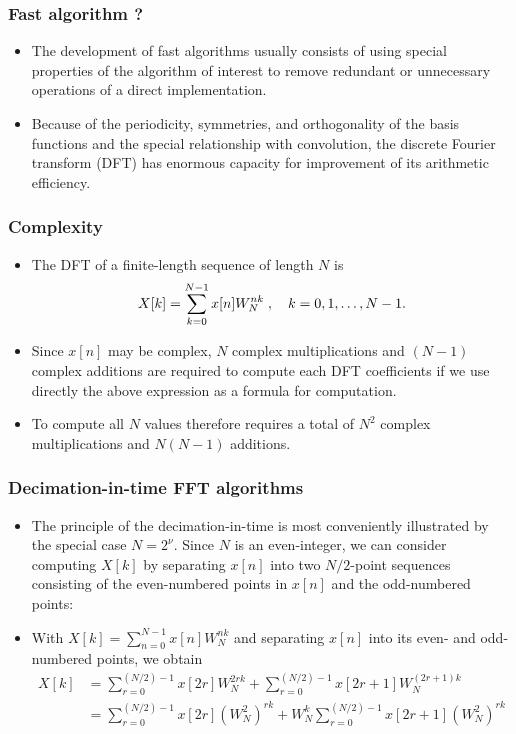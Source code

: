 \begin{frame}
\frametitle{Fast algorithm ?}
\begin{itemize}
\item The development of fast algorithms usually consists of using special properties of the algorithm of interest to remove redundant or unnecessary operations of a direct implementation. 
\item Because of the periodicity, symmetries, and orthogonality of the basis functions and the special relationship with convolution, the discrete Fourier transform (DFT) has enormous capacity for improvement of its arithmetic efficiency.
\end{itemize}
\end{frame}

\begin{frame}
\frametitle{Complexity}
\begin{itemize}
\item The DFT of a finite-length sequence of length $N$ is
\[
X[k]= \sum_{k=0}^{N-1} x[n] W_N^{nk} \;, \quad k=0,1,\dots,N-1.
\]
\item Since $x[n]$ may be complex, $N$ complex multiplications and $(N-1)$ complex additions are required to compute each DFT coefficients if we use directly the above expression as a formula for computation.
\item To compute all $N$ values therefore requires a total of $N^2$ complex multiplications and $N(N-1)$ additions.
\end{itemize}
\end{frame}

\begin{frame}
\frametitle{Decimation-in-time FFT algorithms}
\begin{itemize}
\item The principle of the \alert{decimation-in-time} is most conveniently illustrated by the special case $N=2^\nu$. Since $N$ is an even-integer, we can consider computing $X[k]$ by separating $x[n]$ into two $N/2$-point sequences consisting of the \alert{even-numbered points} in $x[n]$ and the \alert{odd-numbered} points:
\item With $X[k]= \sum_{n=0}^{N-1} x[n] W_N^{nk}$ and separating $x[n]$ into its even- and odd-numbered points, we obtain
\begin{align*}
X[k]&=\sum_{r=0}^{(N/2)-1}x[2r]W_{N}^{2rk}+\sum_{r=0}^{(N/2)-1}x[2r+1]W_{N}^{(2r+1)k} \\
&=\sum_{r=0}^{(N/2)-1}x[2r](W_{N}^{2})^{rk}+W_{N}^{k}\sum_{r=0}^{(N/2)-1}x[2r+1](W_{N}^{2})^{rk}
\end{align*}
\end{itemize}
\end{frame}

